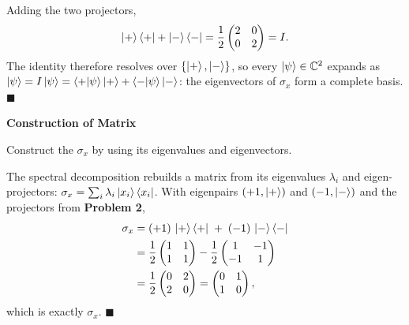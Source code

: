 \documentclass[a4paper, 10pt]{article}
\begin{document}
\begin{solution}
	\myspace

	\noindent Adding the two projectors,
	\[
		\ket{+}\bra{+} + \ket{-}\bra{-}
		= \frac{1}{2}\begin{pmatrix} 2 & 0 \\ 0 & 2 \end{pmatrix}
		= I.
	\]
	The identity therefore resolves over \( \{\ket{+}, \ket{-}\} \), so every \( \ket{\psi} \in \mathbb{C}^2 \) expands as
	\( \ket{\psi} = I\ket{\psi} = \braket{+ \vert \psi}\ket{+} + \braket{- \vert \psi}\ket{-} \):
	the eigenvectors of \( \sigma_x \) form a complete basis. \( \blacksquare \)
\end{solution}

\begin{problem}
\textbf{Construction of Matrix}
\par Construct the \( \sigma_x \) by using its eigenvalues and eigenvectors.
\end{problem}

\begin{solution}
	\noindent The spectral decomposition rebuilds a matrix from its eigenvalues \( \lambda_i \) and eigen-projectors: \( \sigma_x = \sum_i \lambda_i \ket{x_i}\bra{x_i} \).
	With eigenpairs \( (+1, \ket{+}) \) and \( (-1, \ket{-}) \) and the projectors from \textbf{Problem 2},
	\begin{align*}
		\sigma_x
		 & = (+1)\,\ket{+}\bra{+} \;+\; (-1)\,\ket{-}\bra{-}         \\
		 & = \frac{1}{2}\begin{pmatrix} 1 & 1 \\ 1 & 1 \end{pmatrix}
		- \frac{1}{2}\begin{pmatrix} 1 & -1 \\ -1 & 1 \end{pmatrix}  \\
		 & = \frac{1}{2}\begin{pmatrix} 0 & 2 \\ 2 & 0 \end{pmatrix}
		= \begin{pmatrix} 0 & 1 \\ 1 & 0 \end{pmatrix},
	\end{align*}
	which is exactly \( \sigma_x \). \( \blacksquare \)
\end{solution}
\end{document}
